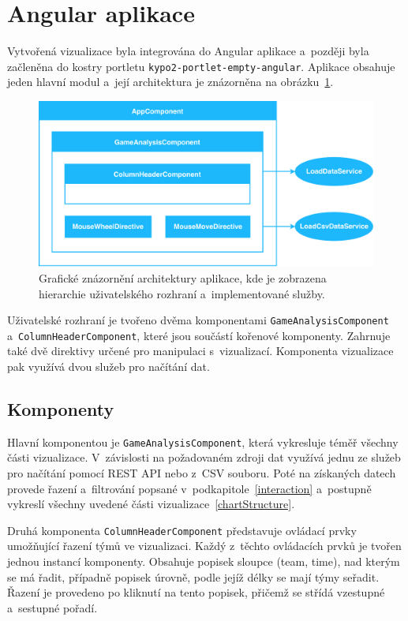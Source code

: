 \documentclass[
  digital, %
  oneside, %
  table,   %
  nolof,     %
  nolot,     %
]{fithesis3}
\begin{document}
\section{Angular aplikace}
Vytvořená vizualizace byla integrována do Angular aplikace a~později byla začleněna do kostry portletu \verb|kypo2-portlet-empty-angular|. Aplikace obsahuje jeden hlavní modul a~její architektura je znázorněna na obrázku~\ref{fig:architecture}.
\begin{figure}[H]
  \begin{center}
    \includegraphics[width=12.7cm]{images/architektura-4.pdf}
  \end{center}
  \caption{Grafické znázornění architektury aplikace, kde je zobrazena hierarchie uživatelského rozhraní a~implementované služby.}
  \label{fig:architecture}
\end{figure}
Uživatelské rozhraní je tvořeno dvěma komponentami \verb|GameAna|\-\verb|lysisComponent| a~\verb|ColumnHeaderComponent|, které jsou součástí kořenové komponenty. Zahrnuje také dvě direktivy určené pro manipulaci s~vizualizací. Komponenta vizualizace pak využívá dvou služeb pro načítání dat.
\subsection{Komponenty}
Hlavní komponentou je \verb|GameAnalysisComponent|, která vykresluje téměř všechny části vizualizace. V~závislosti na požadovaném zdroji dat využívá jednu ze služeb pro načítání pomocí REST API nebo z~CSV souboru. Poté na získaných datech provede řazení a~filtrování popsané v~podkapitole~\ref{interaction} a~postupně vykreslí všechny uvedené části vizualizace~\ref{chartStructure}.\par
Druhá komponenta \verb|ColumnHeaderComponent| představuje ovládací prvky umožňující řazení týmů ve vizualizaci. Každý z~těchto ovládacích prvků je tvořen jednou instancí komponenty. Obsahuje popisek sloupce (team, time), nad kterým se má řadit, případně popisek úrovně, podle jejíž délky se mají týmy seřadit. Řazení je provedeno po kliknutí na tento popisek, přičemž se střídá vzestupné a~sestupné pořadí.
\end{document}
